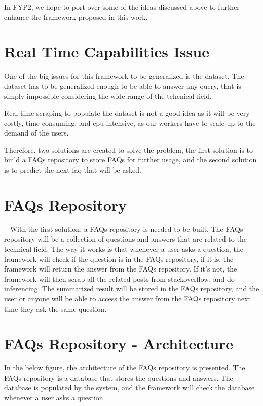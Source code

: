 In FYP2, we hope to port over some of the ideas discussed above to further enhance the framework proposed in this work.

\section{Real Time Capabilities Issue} \label{real-time-capabilities}
One of the big issues for this framework to be generalized is the dataset. The dataset has to be generalized enough to be able to answer any query, that is simply impossible considering the wide range of the tehcnical field.

Real time scraping to populate the dataset is not a good idea as it will be very costly, time consuming, and cpu intensive, as our workers have to scale up to the demand of the users. 

Therefore, two solutions are created to solve the problem, the first solution is to build a FAQs repository to store FAQs for further usage, and the second solution is to predict the next faq that will be asked.

\pagebreak
\section{FAQs Repository}~\label{faq-repo}
With the first solution, a FAQs repository is needed to be built. The FAQs repository will be a collection of questions and answers that are related to the technical field. The way it works is that whenever a user asks a question, the framework will check if the question is in the FAQs repository, if it is, the framework will return the answer from the FAQs repository. If it's not, the framework will then scrap all the related posts from stackoverflow, and do inferencing. The summarized result will be stored in the FAQs repository, and the user or anyone will be able to access the answer from the FAQs repository next time they ask the same question.

\section{FAQs Repository - Architecture} 
In the below figure, the architecture of the FAQs repository is presented. The FAQs repository is a database that stores the questions and answers. The database is populated by the system, and the framework will check the database whenever a user asks a question.

